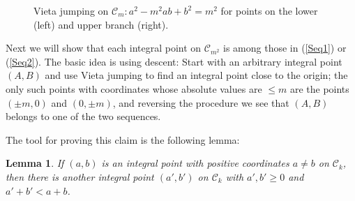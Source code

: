 \documentclass{amsart}
\newtheorem{lemma}{Lemma}
\newcommand{\cC}{{\mathcal C}}
\begin{document}
\begin{figure}[ht!]
 \qquad {} 
\caption{Vieta jumping on $\cC_m: a^2 - m^2 ab + b^2 = m^2$ for points
on the lower (left) and upper branch (right).}\label{descent}
\end{figure}
 

Next we will show that each integral point on $\cC_{m^2}$ is among those in 
(\ref{Seq1}) or (\ref{Seq2}). The basic idea is using descent: Start
with an arbitrary integral point $(A, B)$ and use Vieta jumping to find
an integral point close to the origin; the only such points with coordinates
whose absolute values are $\le m$ are the points $(\pm m, 0)$ and $(0,\pm m)$,
and reversing the procedure we see that $(A,B)$ belongs to one of the two
sequences.

The tool for proving this claim is the following lemma:

\begin{lemma}\label{L2}
  If $(a,b)$ is an integral point with positive coordinates $a \ne b$
  on $\cC_k$, then there is another integral point $(a', b')$ on $\cC_k$
  with $a', b' \ge 0$ and $a' + b' < a + b$.
\end{lemma}
\end{document}
